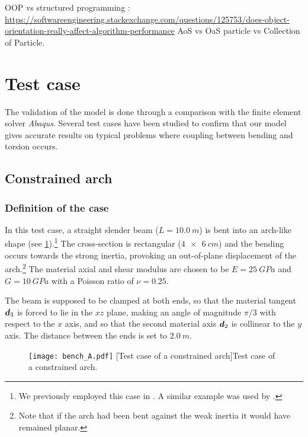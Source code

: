 OOP vs structured programming : \url{https://softwareengineering.stackexchange.com/questions/125753/does-object-orientation-really-affect-algorithm-performance}
AoS vs OaS particle vs Collection of Particle.

\clearpage

\clearpage
\section{Test case}\label{sec=testcase}

The validation of the model is done through a comparison with the finite element solver \emph{Abaqus}. Several test cases have been studied to confirm that our model gives accurate results on typical problems where coupling between bending and torsion occurs.

\subsection{Constrained arch}\label{sec=testcase}

\subsubsection{Definition of the case}

In this test case, a straight slender beam ($L = \SI{10.0}{m}$) is bent into an arch-like shape (see \cref{fig:bench_arch}).\footnote{We previously employed this case in \cite{Lefevre2017}. A similar example was used by .} The cross-section is rectangular ($\SI{4x6}{cm}$) and the bending occurs towards the strong inertia, provoking an out-of-plane displacement of the arch.\footnote{Note that if the arch had been bent against the weak inertia it would have remained planar.} The material axial and shear modulus are chosen to be $E=\SI{25}{GPa}$ and $G=\SI{10}{GPa}$ with a Poisson ratio of $\nu=0.25$.

The beam is supposed to be clamped at both ends, so that the material tangent $\boldsymbol{d}_3$ is forced to lie in the $xz$ plane, making an angle of magnitude $\pi/3$ with respect to the $x$ axis, and so that the second material axis $\boldsymbol{d}_2$ is collinear to the $y$ axis. The distance between the ends is set to $\SI{2.0}{m}$.
\begin{figure}[!h]
     	\centering
	\texttt{[image: bench\_A.pdf]}
	[Test case of a constrained arch]{Test case of a constrained arch.}
	\label{fig:bench_arch}
\end{figure}


